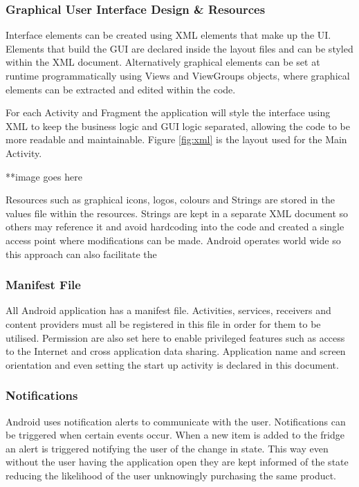 \documentclass[a4paper, 11pt]{article}
\begin{document}
\subsubsection{Graphical User Interface Design \& Resources}
Interface elements can be created using XML elements that make up the UI. Elements that build the GUI are declared inside the layout files and can be styled within the XML document. Alternatively graphical elements can be set at runtime programmatically using Views and ViewGroups objects, where graphical elements can be extracted and edited within the code. 

For each Activity and Fragment the application will style the interface using XML to keep the business logic and GUI logic separated, allowing the code to be more readable and maintainable. Figure \ref{fig:xml} is the layout used for the Main Activity. 

**image goes here

Resources such as graphical icons, logos, colours and Strings are stored in the values file within the resources. Strings are kept in a separate XML document so others may reference it and avoid hardcoding into the code and created a single access point where modifications can be made. Android operates world wide so this approach can also facilitate the 

\subsubsection{Manifest File}
All Android application has a manifest file. Activities, services, receivers and content providers must all be registered in this file in order for them to be utilised. Permission are also set here to enable privileged features such as access to the Internet and cross application data sharing. Application name and screen orientation and even setting the start up activity is declared in this document.

\subsubsection{Notifications}
Android uses notification alerts to communicate with the user. Notifications can be triggered when certain events occur. When a new item is added to the fridge an alert is triggered notifying the user of the change in state. This way even without the user having the application open they are kept informed of the state reducing the likelihood of the user unknowingly purchasing the same product.
\end{document}
